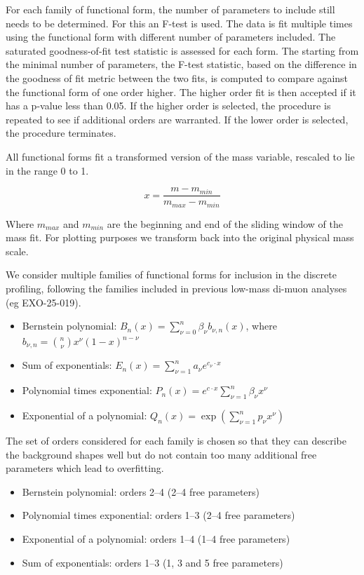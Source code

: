 For each family of functional form, the number of parameters to include still needs to be determined.
For this an F-test is used.
The data is fit multiple times using the functional form with different number of parameters included.
The saturated goodness-of-fit test statistic is assessed for each form.
The starting from the minimal number of parameters, the F-test statistic, based on the difference in the goodness of fit metric between the two fits, is computed to compare against the functional form of one order higher.
The higher order fit is then accepted if it has a p-value less than 0.05.
If the higher order is selected, the procedure is repeated to see if additional orders are warranted.
If the lower order is selected, the procedure terminates.

All functional forms fit a transformed version of the mass variable, rescaled to lie in the range 0 to 1.

\begin{equation}
    x = \frac{m - m_{min}}{m_{max} - m_{min}}
\end{equation}

Where $m_{max}$ and $m_{min}$ are the beginning and end of the sliding window of the mass fit.
For plotting purposes we transform back into the original physical mass scale.

We consider multiple families of functional forms for inclusion in the discrete profiling, following the families included in previous low-mass di-muon analyses (eg EXO-25-019).
\begin{itemize}
    \item Bernstein polynomial: $B_n(x) = \sum_{\nu=0}^{n} \beta_\nu b_{\nu,n}(x)$, where $b_{\nu,n} = \binom{n}{\nu} x^\nu (1-x)^{n-\nu}$
    \item Sum of exponentials: $E_n(x) = \sum_{\nu=1}^{n} a_\nu e^{c_\nu \cdot x}$
    \item Polynomial times exponential: $P_n(x) = e^{c \cdot x} \sum_{\nu=1}^{n} \beta_\nu x^\nu$
    \item Exponential of a polynomial: $Q_n(x) = \exp\!\left( \sum_{\nu=1}^{n} p_\nu x^\nu \right)$
\end{itemize}

The set of orders considered for each family is chosen so that they can describe the background shapes well but do not contain too many additional free parameters which lead to overfitting.

\begin{itemize}
    \item Bernstein polynomial: orders 2--4 (2--4 free parameters)
    \item Polynomial times exponential: orders 1--3 (2--4 free parameters)
    \item Exponential of a polynomial: orders 1--4 (1--4 free parameters)
    \item Sum of exponentials: orders 1--3 (1, 3 and 5 free parameters)
\end{itemize}

